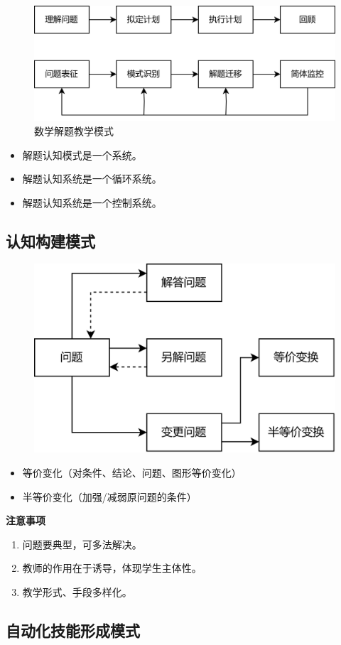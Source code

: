 \begin{figure}[H]
    \centering
    \includegraphics[width=0.5\linewidth]{image/数学解题教学模式.png}
    \caption{数学解题教学模式}
\end{figure}

\begin{itemize}
    \item 解题认知模式是一个系统。
    \item 解题认知系统是一个循环系统。
    \item 解题认知系统是一个控制系统。
\end{itemize}


\subsection{认知构建模式}

\begin{figure}[H]
    \centering
    \includegraphics[width=0.35\linewidth]{image/认知构建模式.png}
\end{figure}

\begin{itemize}
    \item 等价变化（对条件、结论、问题、图形等价变化）
    \item 半等价变化（加强/减弱原问题的条件）
\end{itemize}

\textbf{注意事项}
\begin{enumerate}
    \item 问题要典型，可多法解决。
    \item 教师的作用在于诱导，体现学生主体性。
    \item 教学形式、手段多样化。
\end{enumerate}




\subsection{自动化技能形成模式}

